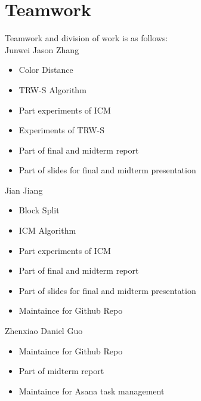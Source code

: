 \documentclass{article} %
\begin{document}
\section{Teamwork}
Teamwork and division of work is as follows:\\
Junwei Jason Zhang
\begin{itemize}
	\item Color Distance
	\item TRW-S Algorithm
	\item Part experiments of ICM
	\item Experiments of TRW-S
	\item Part of final and midterm report
	\item Part of slides for final and midterm presentation
\end{itemize}
Jian Jiang
\begin{itemize}
	\item Block Split
	\item ICM Algorithm
	\item Part experiments of ICM
	\item Part of final and midterm report
	\item Part of slides for final and midterm presentation
	\item Maintaince for Github Repo
\end{itemize}
Zhenxiao Daniel Guo
\begin{itemize}
	\item Maintaince for Github Repo
	\item Part of midterm report
	\item Maintaince for Asana task management
\end{itemize}
        

\end{document}
